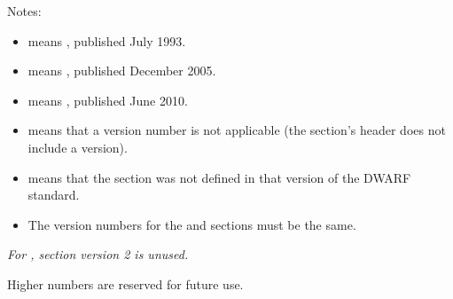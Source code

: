 Notes:

\begin{itemize}
\item  {} means , published July 1993.
\item  {} means , published December 2005.
\item  {} means , published June 2010.
\item  \doublequote{-} means that a version number is not applicable
(the section's header does not include a version).

\item  {} means that the section was not defined in that
version of the DWARF standard.

\item  The version numbers for the \dotdebuginfo{} and \dotdebugtypes{}
sections must be the same.

\end{itemize}

\textit{For \dotdebugframe{}, section version 2 is unused.}

Higher numbers are reserved for future use.


